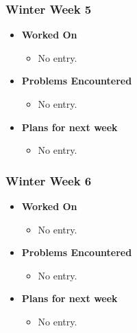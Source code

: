 \documentclass{article}
\begin{document}
\subsubsection{Winter Week 5}
\begin{itemize}
    \item {\textbf{Worked On}}
    \begin{itemize}
      \item No entry.
    \end{itemize}

    \item {\textbf{Problems Encountered}}
    \begin{itemize}
      \item No entry.
    \end{itemize}

    \item{\textbf{Plans for next week}}
    \begin{itemize}
      \item No entry.
    \end{itemize}

\end{itemize}

\subsubsection{Winter Week 6}
\begin{itemize}
    \item {\textbf{Worked On}}
    \begin{itemize}
      \item No entry.
    \end{itemize}

    \item {\textbf{Problems Encountered}}
    \begin{itemize}
      \item No entry.
    \end{itemize}

    \item{\textbf{Plans for next week}}
    \begin{itemize}
      \item No entry.
    \end{itemize}

\end{itemize}
\end{document}

